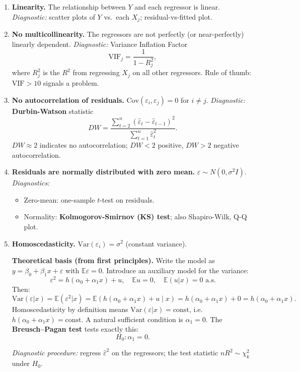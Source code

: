\documentclass[11pt, a4paper]{article}
\begin{document}
\begin{enumerate}[label=\textbf{(\alph*)}]

\item \textbf{Linearity.}
The relationship between $Y$ and each regressor is linear.
\textit{Diagnostic:} scatter plots of $Y$ vs.\ each $X_j$; residual-vs-fitted plot.

\item \textbf{No multicollinearity.}
The regressors are not perfectly (or near-perfectly) linearly dependent.
\textit{Diagnostic:} Variance Inflation Factor
\[
  \mathrm{VIF}_j = \frac{1}{1 - R^2_j},
\]
where $R^2_j$ is the $R^2$ from regressing $X_j$ on all other regressors.
Rule of thumb: $\mathrm{VIF} > 10$ signals a problem.

\item \textbf{No autocorrelation of residuals.}
$\mathrm{Cov}(\varepsilon_i, \varepsilon_j) = 0$ for $i \neq j$.
\textit{Diagnostic:} \textbf{Durbin-Watson} statistic
\[
  DW = \frac{\sum_{t=2}^{n}(\hat\varepsilon_t - \hat\varepsilon_{t-1})^2}{\sum_{t=1}^n \hat\varepsilon_t^2}.
\]
$DW \approx 2$ indicates no autocorrelation; $DW < 2$ positive, $DW > 2$ negative autocorrelation.

\item \textbf{Residuals are normally distributed with zero mean.}
$\varepsilon \sim N(0, \sigma^2 I)$.
\textit{Diagnostics:}
\begin{itemize}
  \item Zero-mean: one-sample $t$-test on residuals.
  \item Normality: \textbf{Kolmogorov-Smirnov (KS) test}; also Shapiro-Wilk, Q-Q plot.
\end{itemize}

\item \textbf{Homoscedasticity.}
$\mathrm{Var}(\varepsilon_i) = \sigma^2$ (constant variance).

\textbf{Theoretical basis (from first principles).}
Write the model as $y = \beta_0 + \beta_1 x + \varepsilon$ with $\mathbb{E}\varepsilon = 0$.
Introduce an auxiliary model for the variance:
\[
  \varepsilon^2 = h(\alpha_0 + \alpha_1 x) + u, \quad
  \mathbb{E}u = 0,\quad \mathbb{E}(u|x) = 0 \text{ a.s.}
\]
Then:
\[
  \mathrm{Var}(\varepsilon|x)
  = \mathbb{E}(\varepsilon^2|x)
  = \mathbb{E}(h(\alpha_0+\alpha_1 x)+u\mid x)
  = h(\alpha_0+\alpha_1 x) + 0
  = h(\alpha_0+\alpha_1 x).
\]
Homoscedasticity by definition means $\mathrm{Var}(\varepsilon|x) = \text{const}$,
i.e.\ $h(\alpha_0+\alpha_1 x) = \text{const}$.
A natural sufficient condition is $\alpha_1 = 0$.
The \textbf{Breusch--Pagan test} tests exactly this:
\[
  H_0\colon \alpha_1 = 0.
\]

\textit{Diagnostic procedure:} regress $\hat\varepsilon^2$ on the regressors;
the test statistic $nR^2 \sim \chi^2_k$ under $H_0$.

\end{enumerate}
\end{document}
